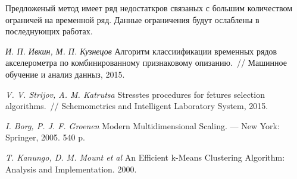 \documentclass[12pt, twoside]{article}
\begin{document}
Предложеный метод имеет ряд недостаткров связаных с большим количеством ограничей на временной ряд. Данные ограничения будут ослаблены в последнующих работах.

\begin{thebibliography}{99}
	\textit{И. П. Ивкин,  М. П. Кузнецов} Алгоритм классиификации временных рядов акселерометра по комбинированному признаковому опизанию.~// Машинное обучение и анализ данныз, 2015.
	
	\textit{V. V. Strijov, A. M. Katrutsa} Stresstes procedures for fetures selection algorithms.~// Schemometrics and Intelligent Laboratory System, 2015.
	
	\textit{I. Borg, P. J. F. Groenen} Modern Multidimensional Scaling. --- New York: Springer, 2005. 540 p.
	
	\textit{T. Kanungo, D. M. Mount et al} An Efficient k-Means Clustering Algorithm: Analysis and Implementation. 2000.
	
\end{thebibliography}
\end{document}
